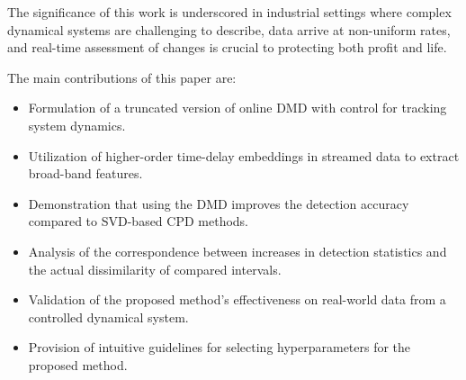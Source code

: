 The significance of this work is underscored in industrial settings where complex dynamical systems are challenging to describe, data arrive at non-uniform rates, and real-time assessment of changes is crucial to protecting both profit and life.

The main contributions of this paper are:
\begin{itemize}
    \item Formulation of a truncated version of online DMD with control for tracking system dynamics.
    \item Utilization of higher-order time-delay embeddings in streamed data to extract broad-band features.
    \item Demonstration that using the DMD improves the detection accuracy compared to SVD-based CPD methods.
    \item Analysis of the correspondence between increases in detection statistics and the actual dissimilarity of compared intervals.
    \item Validation of the proposed method's effectiveness on real-world data from a controlled dynamical system.
    \item Provision of intuitive guidelines for selecting hyperparameters for the proposed method.
\end{itemize}
